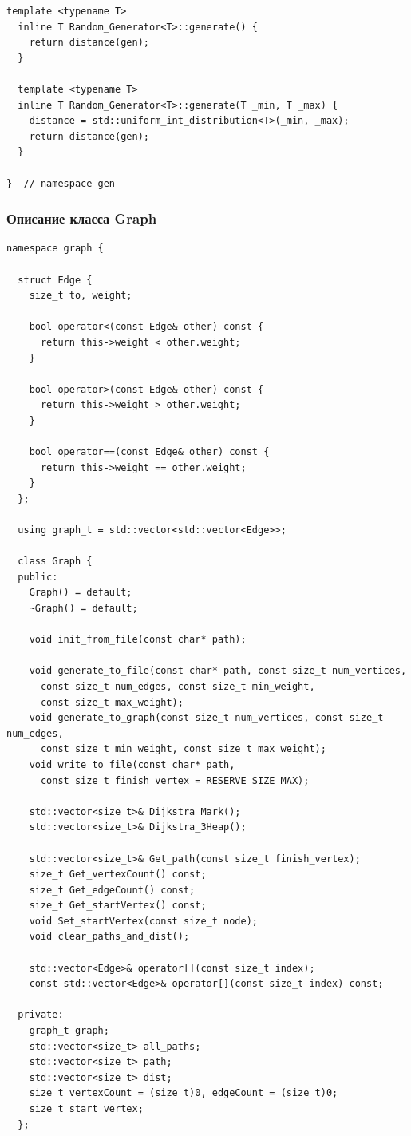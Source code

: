 \begin{text}
\begin{lstlisting}[breaklines=true]
  template <typename T>
  inline T Random_Generator<T>::generate() {
    return distance(gen);
  }

  template <typename T>
  inline T Random_Generator<T>::generate(T _min, T _max) {
    distance = std::uniform_int_distribution<T>(_min, _max);
    return distance(gen);
  }

}  // namespace gen
\end{lstlisting}
\newpage
\subsubsection{Описание класса Graph}
\begin{lstlisting}[breaklines=true]
namespace graph {

  struct Edge {
    size_t to, weight;

    bool operator<(const Edge& other) const {
      return this->weight < other.weight;
    }

    bool operator>(const Edge& other) const {
      return this->weight > other.weight;
    }

    bool operator==(const Edge& other) const {
      return this->weight == other.weight;
    }
  };

  using graph_t = std::vector<std::vector<Edge>>;

  class Graph {
  public:
    Graph() = default;
    ~Graph() = default;

    void init_from_file(const char* path);

    void generate_to_file(const char* path, const size_t num_vertices,
      const size_t num_edges, const size_t min_weight,
      const size_t max_weight);
    void generate_to_graph(const size_t num_vertices, const size_t num_edges,
      const size_t min_weight, const size_t max_weight);
    void write_to_file(const char* path,
      const size_t finish_vertex = RESERVE_SIZE_MAX);

    std::vector<size_t>& Dijkstra_Mark();
    std::vector<size_t>& Dijkstra_3Heap();

    std::vector<size_t>& Get_path(const size_t finish_vertex);
    size_t Get_vertexCount() const;
    size_t Get_edgeCount() const;
    size_t Get_startVertex() const;
    void Set_startVertex(const size_t node);
    void clear_paths_and_dist();

    std::vector<Edge>& operator[](const size_t index);
    const std::vector<Edge>& operator[](const size_t index) const;

  private:
    graph_t graph;
    std::vector<size_t> all_paths;
    std::vector<size_t> path;
    std::vector<size_t> dist;
    size_t vertexCount = (size_t)0, edgeCount = (size_t)0;
    size_t start_vertex;
  };


\end{lstlisting}
\end{text}
